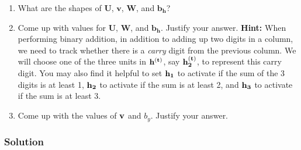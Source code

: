 \documentclass[
  letterpaper,
  DIV=11,
  numbers=noendperiod]{scrartcl}
\begin{document}
\begin{enumerate}
\def\labelenumi{(\alph{enumi})}
\item
  What are the shapes of \(\mathbf{U}\), \(\mathbf{v}\), \(\mathbf{W}\),
  and \(\mathbf{b}_{\mathbf{h}}\)?
\item
  Come up with values for \(\mathbf{U}\), \(\mathbf{W}\), and
  \(\mathbf{b}_{\mathbf{h}}\). Justify your answer. \textbf{Hint:} When
  performing binary addition, in addition to adding up two digits in a
  column, we need to track whether there is a \textit{carry} digit from
  the previous column. We will choose one of the three units in
  \(\bf{h}^{(t)}\), say \(\bf{h}_2^{(t)}\), to represent this carry
  digit. You may also find it helpful to set \(\bf{h}_1\) to activate if
  the sum of the 3 digits is at least 1, \(\bf{h}_2\) to activate if the
  sum is at least 2, and \(\bf{h}_3\) to activate if the sum is at least
  3.
\item
  Come up with the values of \(\bf{v}\) and \(b_y\). Justify your
  answer.
\end{enumerate}

\subsubsection{Solution}\label{solution-2}
\end{document}

